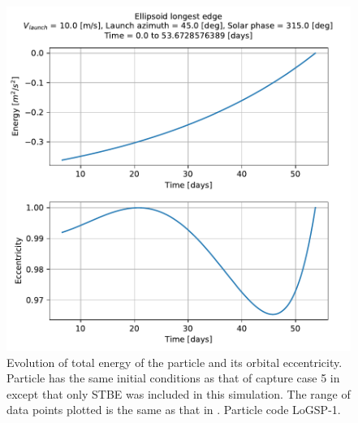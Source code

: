 \begin{figure}[htb]
\centering
\captionsetup{justification=centering}
\includegraphics[width=\linewidth, height=0.45\textheight, keepaspectratio=true]{longest_edge_perturbations/3.2Density_1cmSize/10ms_45Azimuth_315SolarPhase/noSRP_eccentricity_energy.pdf}
\caption{Evolution of total energy of the particle and its orbital eccentricity. Particle has the same initial conditions as that of capture case 5 in  except that only \gls{STBE} was included in this simulation. The range of data points plotted is the same as that in . Particle code LoGSP-1.}
\label{fig:LoGSP_1_capture_case_5_eccentricity_energy_noSRP}
\end{figure}
\FloatBarrier
